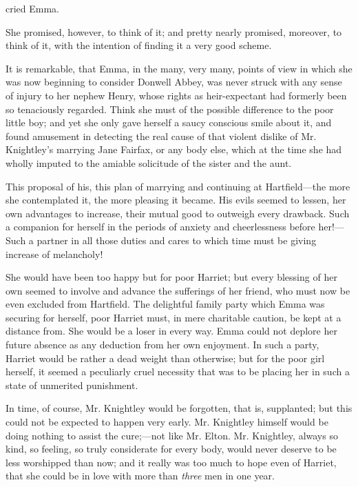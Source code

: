  cried Emma. 

She promised, however, to think of it; and pretty nearly promised, moreover, to think of it, with the intention of finding it a very good scheme.

It is remarkable, that Emma, in the many, very many, points of view in which she was now beginning to consider Donwell Abbey, was never struck with any sense of injury to her nephew Henry, whose rights as heir-expectant had formerly been so tenaciously regarded. Think she must of the possible difference to the poor little boy; and yet she only gave herself a saucy conscious smile about it, and found amusement in detecting the real cause of that violent dislike of Mr. Knightley's marrying Jane Fairfax, or any body else, which at the time she had wholly imputed to the amiable solicitude of the sister and the aunt.

This proposal of his, this plan of marrying and continuing at Hartfield---the more she contemplated it, the more pleasing it became. His evils seemed to lessen, her own advantages to increase, their mutual good to outweigh every drawback. Such a companion for herself in the periods of anxiety and cheerlessness before her!---Such a partner in all those duties and cares to which time must be giving increase of melancholy!

She would have been too happy but for poor Harriet; but every blessing of her own seemed to involve and advance the sufferings of her friend, who must now be even excluded from Hartfield. The delightful family party which Emma was securing for herself, poor Harriet must, in mere charitable caution, be kept at a distance from. She would be a loser in every way. Emma could not deplore her future absence as any deduction from her own enjoyment. In such a party, Harriet would be rather a dead weight than otherwise; but for the poor girl herself, it seemed a peculiarly cruel necessity that was to be placing her in such a state of unmerited punishment.

In time, of course, Mr. Knightley would be forgotten, that is, supplanted; but this could not be expected to happen very early. Mr. Knightley himself would be doing nothing to assist the cure;---not like Mr. Elton. Mr. Knightley, always so kind, so feeling, so truly considerate for every body, would never deserve to be less worshipped than now; and it really was too much to hope even of Harriet, that she could be in love with more than {\em three} men in one year.

